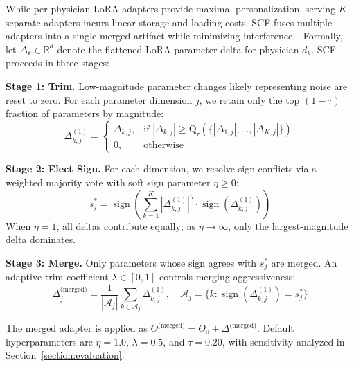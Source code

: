 While per-physician LoRA adapters provide maximal personalization, serving $K$ separate adapters incurs linear storage and loading costs. SCF fuses multiple adapters into a single merged artifact while minimizing interference~\cite{yadavTIESMergingResolvingInterference2023a}. Formally, let $\Delta_k \in \mathbb{R}^{d}$ denote the flattened LoRA parameter delta for physician $d_k$. SCF proceeds in three stages:

\textbf{Stage 1: Trim.} Low-magnitude parameter changes likely representing noise are reset to zero. For each parameter dimension $j$, we retain only the top $(1-\tau)$ fraction of parameters by magnitude:
\begin{equation}
\Delta_{k,j}^{(1)} = \begin{cases}
\Delta_{k,j}, & \text{if } |\Delta_{k,j}| \ge \text{Q}_{\tau}(\{|\Delta_{1,j}|,\ldots,|\Delta_{K,j}|\}) \\
0, & \text{otherwise}
\end{cases}
\end{equation}

\textbf{Stage 2: Elect Sign.} For each dimension, we resolve sign conflicts via a weighted majority vote with soft sign parameter $\eta \ge 0$:
\begin{equation}
s_j^* = \operatorname{sign}\!\left(\sum_{k=1}^{K} |\Delta_{k,j}^{(1)}|^{\eta} \cdot \operatorname{sign}(\Delta_{k,j}^{(1)})\right)
\end{equation}
When $\eta=1$, all deltas contribute equally; as $\eta \to \infty$, only the largest-magnitude delta dominates.

\textbf{Stage 3: Merge.} Only parameters whose sign agrees with $s_j^*$ are merged. An adaptive trim coefficient $\lambda \in [0,1]$ controls merging aggressiveness:
\begin{equation}
\Delta_j^{\text{(merged)}} = \frac{1}{|\mathcal{A}_j|} \sum_{k \in \mathcal{A}_j} \Delta_{k,j}^{(1)},\quad
\mathcal{A}_j = \{k : \operatorname{sign}(\Delta_{k,j}^{(1)}) = s_j^*\}
\end{equation}

The merged adapter is applied as $\Theta^{\text{(merged)}} = \Theta_0 + \Delta^{\text{(merged)}}$. Default hyperparameters are $\eta=1.0$, $\lambda=0.5$, and $\tau=0.20$, with sensitivity analyzed in Section~\ref{section:evaluation}.




